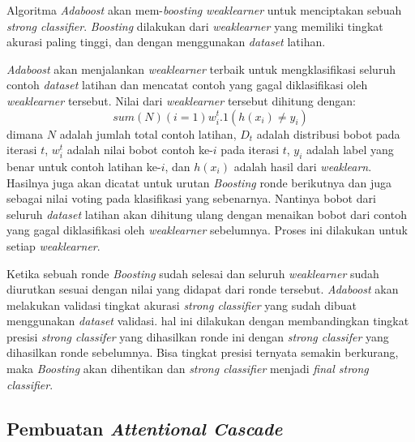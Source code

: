 Algoritma \emph{Adaboost} akan mem-\emph{boosting} \emph{weaklearner} untuk 
menciptakan sebuah \emph{strong classifier}. \emph{Boosting} dilakukan dari 
\emph{weaklearner} yang memiliki tingkat akurasi paling tinggi, dan dengan 
menggunakan \emph{dataset} latihan.

\emph{Adaboost} akan menjalankan \emph{weaklearner} terbaik untuk 
mengklasifikasi seluruh contoh \emph{dataset} latihan dan mencatat contoh yang 
gagal diklasifikasi oleh \emph{weaklearner} tersebut. 
Nilai dari \emph{weaklearner} 
tersebut dihitung dengan:
\begin{equation}
  sum(N)(i=1) w^t_i.1(h(x_i)\ne y_i)
\end{equation} 
dimana $N$ adalah jumlah total contoh latihan, $D_t$ adalah distribusi bobot pada 
iterasi $t$, $w^t_i$ adalah nilai bobot contoh ke-$i$ pada iterasi $t$, 
$y_i$ adalah label yang benar untuk contoh latihan ke-$i$, dan $h(x_i)$ 
adalah hasil dari \emph{weaklearn}. 
Hasilnya juga akan dicatat untuk urutan \emph{Boosting} ronde berikutnya dan 
juga sebagai nilai voting pada klasifikasi yang sebenarnya. 
Nantinya bobot dari seluruh \emph{dataset} latihan akan dihitung ulang dengan menaikan bobot dari contoh 
yang gagal diklasifikasi oleh \emph{weaklearner} sebelumnya. Proses ini dilakukan 
untuk setiap \emph{weaklearner}. 

Ketika sebuah ronde \emph{Boosting} sudah selesai dan seluruh \emph{weaklearner} sudah  diurutkan sesuai dengan 
nilai yang didapat dari ronde tersebut. \emph{Adaboost} akan melakukan validasi 
tingkat akurasi \emph{strong classifier} yang sudah dibuat menggunakan \emph{dataset} validasi. 
hal ini dilakukan dengan membandingkan tingkat presisi \emph{strong classifer} 
yang dihasilkan ronde ini dengan \emph{strong classifer} yang dihasilkan ronde 
sebelumnya. Bisa tingkat presisi ternyata semakin berkurang, maka \emph{Boosting} 
akan dihentikan dan \emph{strong classifier} 
menjadi \emph{final strong classifier}.

\subsection{Pembuatan \emph{Attentional Cascade}}

